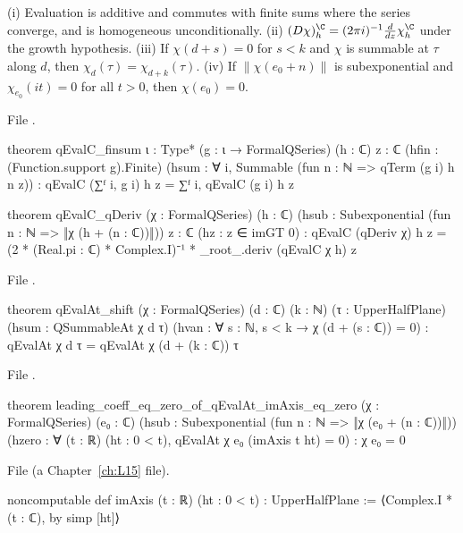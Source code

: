 \begin{theorem}\label{l14:thm:qevallin}
(i) Evaluation is additive and commutes with finite sums where the series converge, and is homogeneous unconditionally.
(ii) $(D\chi)^{\C}_h = (2\pi i)^{-1}\frac{d}{dz}\chi^{\C}_h$ under the growth hypothesis.
(iii) If $\chi(d+s) = 0$ for $s<k$ and $\chi$ is summable at $\tau$ along $d$, then $\chi_d(\tau) = \chi_{d+k}(\tau)$.
(iv) If $\|\chi(e_0+n)\|$ is subexponential and $\chi_{e_0}(it) = 0$ for all $t>0$, then $\chi(e_0) = 0$.
\end{theorem}
\noindent File .
\begin{leancode}
theorem qEvalC_finsum {ι : Type*} (g : ι → FormalQSeries) (h : ℂ) {z : ℂ}
    (hfin : (Function.support g).Finite)
    (hsum : ∀ i, Summable (fun n : ℕ => qTerm (g i) h n z)) :
    qEvalC (∑ᶠ i, g i) h z = ∑ᶠ i, qEvalC (g i) h z

theorem qEvalC_qDeriv (χ : FormalQSeries) (h : ℂ)
    (hsub : Subexponential (fun n : ℕ => ‖χ (h + (n : ℂ))‖)) {z : ℂ} (hz : z ∈ imGT 0) :
    qEvalC (qDeriv χ) h z
      = (2 * (Real.pi : ℂ) * Complex.I)⁻¹ * _root_.deriv (qEvalC χ h) z
\end{leancode}
\noindent File .
\begin{leancode}
theorem qEvalAt_shift (χ : FormalQSeries) (d : ℂ) (k : ℕ) (τ : UpperHalfPlane)
    (hsum : QSummableAt χ d τ) (hvan : ∀ s : ℕ, s < k → χ (d + (s : ℂ)) = 0) :
    qEvalAt χ d τ = qEvalAt χ (d + (k : ℂ)) τ
\end{leancode}
\noindent File .
\begin{leancode}
theorem leading_coeff_eq_zero_of_qEvalAt_imAxis_eq_zero (χ : FormalQSeries) (e₀ : ℂ)
    (hsub : Subexponential (fun n : ℕ => ‖χ (e₀ + (n : ℂ))‖))
    (hzero : ∀ (t : ℝ) (ht : 0 < t), qEvalAt χ e₀ (imAxis t ht) = 0) :
    χ e₀ = 0
\end{leancode}
\noindent File  (a Chapter~\ref{ch:L15} file).
\begin{leancode}
noncomputable def imAxis (t : ℝ) (ht : 0 < t) : UpperHalfPlane :=
  ⟨Complex.I * (t : ℂ), by simp [ht]⟩
\end{leancode}
